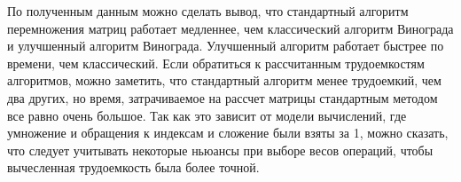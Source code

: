 \begin{figure}[ht!]
\end{figure}

По полученным данным можно сделать вывод, что стандартный алгоритм перемножения матриц работает медленнее, чем классический алгоритм Винограда и улучшенный алгоритм Винограда. Улучшенный алгоритм работает быстрее по времени, чем классический. Если обратиться к рассчитанным трудоемкостям алгоритмов, можно заметить, что стандартный алгоритм менее трудоемкий, чем два других, но время, затрачиваемое на рассчет матрицы стандартным методом все равно очень большое. Так как это зависит от модели вычислений, где умножение и обращения к индексам и сложение были взяты за 1, можно сказать, что следует учитывать некоторые ньюансы при выборе весов операций, чтобы вычесленная трудоемкость была более точной.
